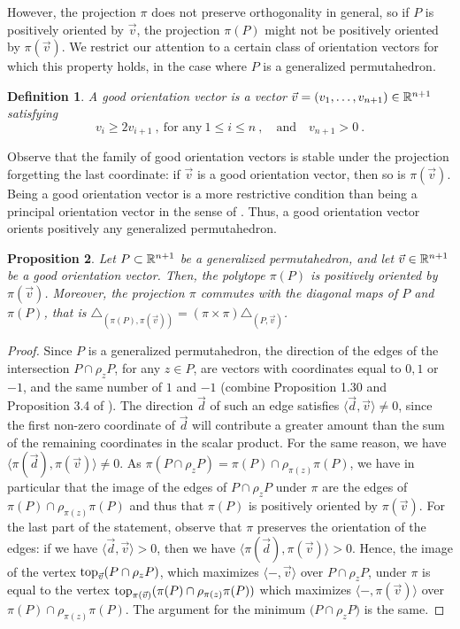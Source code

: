 \documentclass[10pt]{amsart}
\newtheorem{definition}{Definition}[section]
\newtheorem{proposition}[definition]{Proposition}
\theoremstyle{remark}
\begin{document}
However, the projection $\pi$ does not preserve orthogonality in general, so if $P$ is positively oriented by $\vec v$, the projection $\pi(P)$ might not be positively oriented by $\pi(\vec v)$.  
We restrict our attention to a certain class of orientation vectors for which this property holds, in the case where $P$ is a generalized permutahedron.

\begin{definition} 
\label{def:goodvector}
A \emph{good orientation vector} is a vector $\vec v=(v_1, \ldots, v_{n+1})\in \mathbb{R}^{n+1}$ satisfying \[v_{i}\geq2v_{i+1}\ , \ \text{for any}\  1\leq i\leq n\ , \quad \text{and}\quad  v_{n+1}>0 \ . \]
\end{definition}

Observe that the family of good orientation vectors is stable under the projection forgetting the last coordinate: if $\vec v$ is a good orientation vector, then so is $\pi(\vec v)$.
Being a good orientation vector is a more restrictive condition than being a principal orientation vector in the sense of \cite[Definition 3.15]{LA21}. Thus, a good orientation vector orients positively any generalized permutahedron. 

\begin{proposition} 
\label{prop:goodprojection}
Let $P \subset \mathbb{R}^{n+1}$ be a generalized permutahedron, and let $\vec v \in \mathbb{R}^{n+1}$ be a good orientation vector. 
Then, the polytope $\pi(P)$ is positively oriented by $\pi(\vec v)$. 
Moreover, the projection $\pi$ commutes with the diagonal maps of $P$ and $\pi(P)$, that is $\triangle_{(\pi(P),\pi(\vec v))}=(\pi \times \pi)\triangle_{(P,\vec v)}$.
\end{proposition}

\begin{proof} 
Since $P$ is a generalized permutahedron, the direction of the edges of the intersection $P\cap\rho_z P$, for any $z \in P$, are vectors with coordinates equal to $0,1$ or $-1$, and the same number of $1$ and $-1$ (combine Proposition 1.30 and Proposition 3.4 of \cite{LA21}). 
The direction $\vec d$ of such an edge satisfies $\langle \vec d, \vec v \rangle \neq 0$, since the first non-zero coordinate of $\vec d$ will contribute a greater amount than the sum of the remaining coordinates in the scalar product.  
For the same reason, we have $\langle \pi(\vec d), \pi(\vec v) \rangle \neq 0$. As $\pi(P\cap\rho_z P)=\pi(P)\cap\rho_{\pi(z)}\pi(P)$, we have in particular that the image of the edges of $P\cap\rho_z P$ under $\pi$ are the edges of $\pi(P)\cap\rho_{\pi(z)}\pi(P)$ and thus that $\pi(P)$ is positively oriented by $\pi(\vec v)$. 
For the last part of the statement, observe that $\pi$ preserves the orientation of the edges: if we have $\langle \vec d, \vec v \rangle >0$, then we have $\langle \pi(\vec d), \pi(\vec v) \rangle > 0$. 
Hence, the image of the vertex $\operatorname{top}_{\vec v}(P\cap\rho_z P)$, which maximizes $\langle - ,\vec v \rangle$ over $P\cap\rho_z P$, under $\pi$ is equal to the vertex $\operatorname{top}_{\pi(\vec v)}(\pi(P)\cap\rho_{\pi(z)} \pi(P))$ which maximizes $\langle - ,\pi(\vec v) \rangle$ over $\pi(P)\cap\rho_{\pi(z)} \pi(P)$. The argument for the minimum $\bm(P\cap\rho_z P)$ is the same.
\end{proof}
\end{document}
